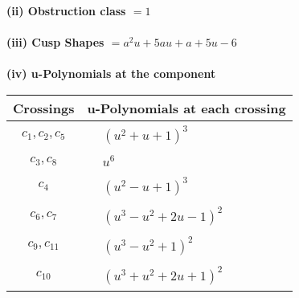 \documentclass[1p]{elsarticle_modified}
\theoremstyle{definition}
\begin{document}
\flushleft \textbf{(ii) Obstruction class $= 1$}\\~\\
\flushleft \textbf{(iii) Cusp Shapes $= a^2 u+5 a u+a+5 u-6$}\\~\\
\newpage\renewcommand{\arraystretch}{1}
\flushleft \textbf{(iv) u-Polynomials at the component}\newline \\
\begin{tabular}{m{50pt}|m{274pt}}
Crossings & \hspace{64pt}u-Polynomials at each crossing \\
\hline $$\begin{aligned}c_{1},c_{2},c_{5}\end{aligned}$$&$\begin{aligned}
&(u^2+u+1)^3
\end{aligned}$\\
\hline $$\begin{aligned}c_{3},c_{8}\end{aligned}$$&$\begin{aligned}
&u^6
\end{aligned}$\\
\hline $$\begin{aligned}c_{4}\end{aligned}$$&$\begin{aligned}
&(u^2- u+1)^3
\end{aligned}$\\
\hline $$\begin{aligned}c_{6},c_{7}\end{aligned}$$&$\begin{aligned}
&(u^3- u^2+2 u-1)^2
\end{aligned}$\\
\hline $$\begin{aligned}c_{9},c_{11}\end{aligned}$$&$\begin{aligned}
&(u^3- u^2+1)^2
\end{aligned}$\\
\hline $$\begin{aligned}c_{10}\end{aligned}$$&$\begin{aligned}
&(u^3+u^2+2 u+1)^2
\end{aligned}$\\
\hline
\end{tabular}\\~\\
\end{document}
